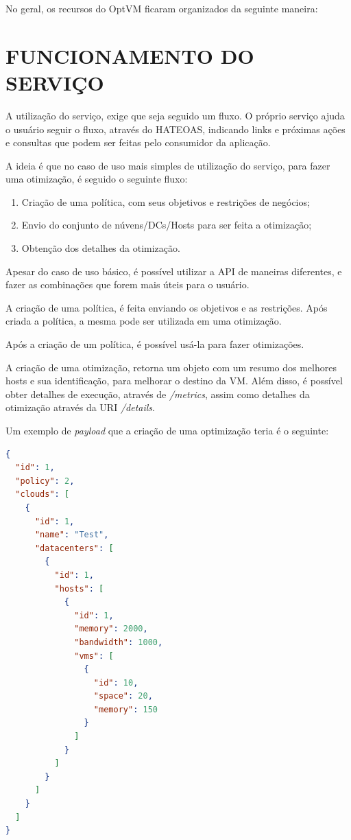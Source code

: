 No geral, os recursos do OptVM ficaram organizados da seguinte maneira:





\section{FUNCIONAMENTO DO SERVIÇO}

A utilização do serviço, exige que seja seguido um fluxo. O próprio serviço 
ajuda o usuário seguir o fluxo, através do HATEOAS, indicando links e próximas
ações e consultas que podem ser feitas pelo consumidor da aplicação.

A ideia é que no caso de uso mais simples de utilização do serviço, 
para fazer uma otimização, é seguido o seguinte fluxo:

\begin{enumerate}
 \item Criação de uma política, com seus objetivos e restrições de negócios;
 \item Envio do conjunto de núvens/DCs/Hosts para ser feita a otimização;
 \item Obtenção dos detalhes da otimização.
\end{enumerate}

Apesar do caso de uso básico, é possível utilizar a API de maneiras diferentes,
e fazer as combinações que forem mais úteis para o usuário.

A criação de uma política, é feita enviando os objetivos e as restrições.
Após criada a política, a mesma pode ser utilizada em uma otimização. 



Após a criação de um política, é possível usá-la para fazer otimizações.

A criação de uma otimização, retorna um objeto com um resumo dos melhores hosts
e sua identificação, para melhorar o destino da VM.
Além disso, é possível obter detalhes de execução, através de \textit{/metrics}, assim
como detalhes da otimização através da URI \textit{/details}.

Um exemplo de \textit{payload} que a criação de uma optimização teria é o seguinte:

\begin{lstlisting}[language=json,firstnumber=1]
{
  "id": 1,
  "policy": 2,
  "clouds": [
    {
      "id": 1,
      "name": "Test",
      "datacenters": [
        {
          "id": 1,
          "hosts": [
            {
              "id": 1,
              "memory": 2000,
              "bandwidth": 1000,
              "vms": [
                {
                  "id": 10,
                  "space": 20,
                  "memory": 150
                }
              ]
            }
          ]
        }
      ]
    }
  ]
}
\end{lstlisting}

